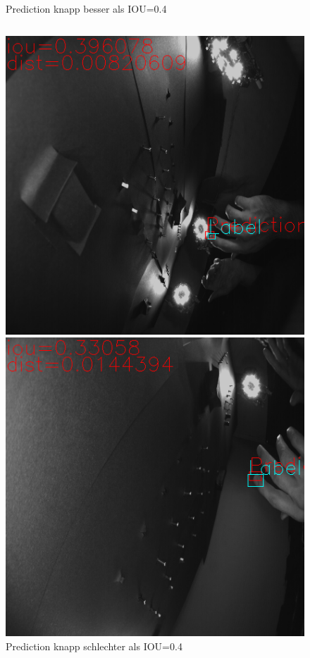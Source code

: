 \begin{figure}
\begin{minipage}[b]{0.48\textwidth}
	\end{minipage}
	\caption{Prediction knapp besser als IOU=0.4}
	\label{img:iou_knapp_gut}
	\begin{verbatim}
	\end{verbatim}
	\centering
	\begin{minipage}[b]{0.48\textwidth}	
		\includegraphics[width=\textwidth]{Kapitel/70Resultate/Bilder/6iouKnappSchlecht.png}
	\end{minipage}
	\hfill
	\begin{minipage}[b]{0.48\textwidth}		
		\includegraphics[width=\textwidth]{Kapitel/70Resultate/Bilder/9iouKnappSchlecht.png}
	\end{minipage}
	\caption{Prediction knapp schlechter als IOU=0.4}
	\label{img:iou_knapp_schlecht}
\end{figure}
